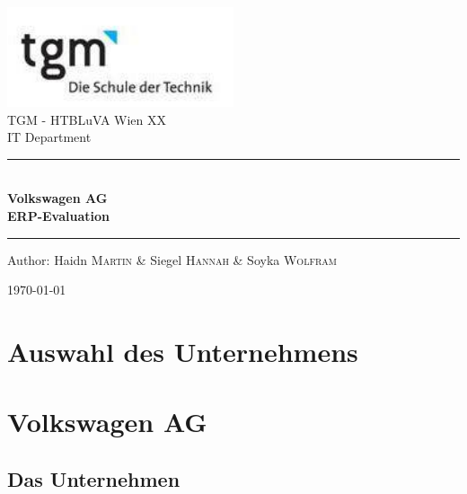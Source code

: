 \documentclass[12pt]{article}
\begin{document}
\begin{titlepage}
\begin{center}
\includegraphics[width=0.5\textwidth]{images/logo}\\[1cm]    

\LARGE TGM - HTBLuVA Wien XX \\ IT Department  \\[1.5cm]

\rule{1.0\textwidth}{1mm}
{ \huge \bfseries \\[0.4cm]  \huge Volkswagen AG \\ \LARGE ERP-Evaluation \\[0.4cm] }

\rule{1.0\textwidth}{1mm}



\noindent 
\vspace{5cm}

\begin{center}
\large
Author: 
Haidn \textsc{Martin} \&
Siegel \textsc{Hannah} \&
Soyka \textsc{Wolfram}
\end{center}

\vfill

{\large \today}

\end{center}
\end{titlepage}

\tableofcontents


\ohead{\headmark}

\newpage

\section{Auswahl des Unternehmens}

\section{Volkswagen AG}
\subsection{Das Unternehmen}
\end{document}
